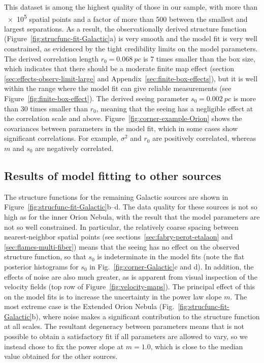 \documentclass[fleqn,usenatbib, useAMS, a4paper]{mnras}
\begin{document}
This dataset is among the highest quality of those in our sample,
with more than \num{e5} spatial points and a factor of more than \num{500}
between the smallest and largest separations.
As a result, the observationally derived structure function (Figure~\ref{fig:strucfunc-fit-Galactic}a)
is very smooth and the model fit is very well constrained,
as evidenced by the tight credibility limits on the model parameters.
The derived correlation length \(r_0 = \SI{0.068}{pc}\) is \num{7} times smaller
than the box size, which indicates that there should be a moderate finite map effect
(section \ref{sec:effects-observ-limit-large} and Appendix~\ref{sec:finite-box-effects}),
but it is well within the range where the model fit can give reliable measurements
(see Figure~\ref{fig:finite-box-effect}).
The derived seeing parameter \(s_0 = \SI{0.002}{pc}\) is more than \num{30} times smaller
than \(r_0\), meaning that the seeing has a negligible effect at the correlation scale and above.
Figure~\ref{fig:corner-example-Orion}  shows  the covariances  between
parameters  in the  model fit,
which in some cases show significant correlations.
For example, \(\sigma^2\) and \(r_0\) are positively correlated,
whereas \(m\) and \(s_0\) are negatively correlated. 

\subsection{Results of model fitting to other sources}
\label{sec:results-model-fitt}

The structure functions for the remaining Galactic sources
are shown in Figure~\ref{fig:strucfunc-fit-Galactic}b--d.
The data quality for these sources is not so high as for the inner Orion Nebula,
with the result that the model parameters are not so well constrained.
In particular, the relatively coarse spacing between nearest-neighbor spatial points
(see sections~\ref{sec:fabry-perot-etalaon} and \ref{sec:flames-multi-fiber})
means that the seeing has no effect on the observed structure function,
so that \(s_0\) is indeterminate in the model fits
(note the flat posterior histograms for \(s_0\) in Fig.~\ref{fig:corner-Galactic}c and d).
In addition, the effects of noise are also much greater,
as is apparent from visual inspection of the velocity fields
(top row of Figure~\ref{fig:velocity-maps}).
The principal effect of this on the model fits is to increase the uncertainty
in the power law slope \(m\).
The most extreme case is the Extended Orion Nebula (Fig.~\ref{fig:strucfunc-fit-Galactic}b),
where noise makes a significant contribution to the structure function at all scales.
The resultant degeneracy between parameters means that
is not possible to obtain a satisfactory fit
if all parameters are allowed to vary,
so we instead chose to fix the power slope at \(m = 1.0\),
which is close to the median value obtained for the other sources.
\end{document}
